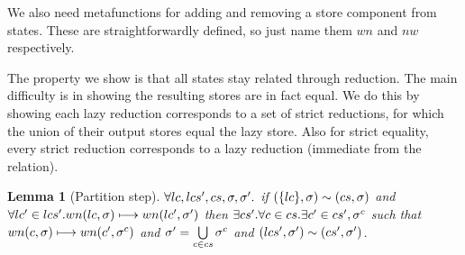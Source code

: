 \documentclass[preprint,onecolumn,9pt]{sigplanconf} %
\newtheorem{lemma}{Lemma}
\begin{document}
We also need metafunctions for adding and removing a store component
from states. These are straightforwardly defined, so just name them
$wn$ and $nw$ respectively.

The property we show is that all states stay related through
reduction. The main difficulty is in showing the resulting stores are
in fact equal. We do this by showing each lazy reduction corresponds
to a set of strict reductions, for which the union of their output
stores equal the lazy store. Also for strict equality, every strict
reduction corresponds to a lazy reduction (immediate from the relation).

\begin{lemma}[Partition step]
$\forall lc, lcs', cs, \sigma, \sigma'.$
 if  $(\{lc\},\sigma) \sim (cs,\sigma)$
 and $\forall lc' \in lcs'. wn(lc,\sigma) \longmapsto wn(lc', \sigma')$ then
 $\exists cs'. \forall c \in cs. \exists c' \in cs', \sigma^c$
 such that $wn(c,\sigma) \longmapsto wn(c', \sigma^c)$
 and       $\sigma' = \bigcup\limits_{c \in cs}{\sigma^c}$
 and       $(lcs',\sigma') \sim (cs',\sigma')$.
\end{lemma}
\end{document}
